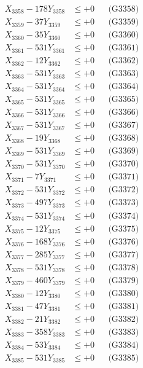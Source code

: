 \documentclass[a4paper,10pt]{article}
\begin{document}
{\begin{align}
X_{3358} - 178Y_{3358} &\leq +0 && \text{(G3358)} \\
X_{3359} - 37Y_{3359} &\leq +0 && \text{(G3359)} \\
X_{3360} - 35Y_{3360} &\leq +0 && \text{(G3360)} \\
\allowbreak
X_{3361} - 531Y_{3361} &\leq +0 && \text{(G3361)} \\
X_{3362} - 12Y_{3362} &\leq +0 && \text{(G3362)} \\
X_{3363} - 531Y_{3363} &\leq +0 && \text{(G3363)} \\
X_{3364} - 531Y_{3364} &\leq +0 && \text{(G3364)} \\
X_{3365} - 531Y_{3365} &\leq +0 && \text{(G3365)} \\
X_{3366} - 531Y_{3366} &\leq +0 && \text{(G3366)} \\
X_{3367} - 531Y_{3367} &\leq +0 && \text{(G3367)} \\
X_{3368} - 19Y_{3368} &\leq +0 && \text{(G3368)} \\
X_{3369} - 531Y_{3369} &\leq +0 && \text{(G3369)} \\
X_{3370} - 531Y_{3370} &\leq +0 && \text{(G3370)} \\
\allowbreak
X_{3371} - 7Y_{3371} &\leq +0 && \text{(G3371)} \\
X_{3372} - 531Y_{3372} &\leq +0 && \text{(G3372)} \\
X_{3373} - 497Y_{3373} &\leq +0 && \text{(G3373)} \\
X_{3374} - 531Y_{3374} &\leq +0 && \text{(G3374)} \\
X_{3375} - 12Y_{3375} &\leq +0 && \text{(G3375)} \\
X_{3376} - 168Y_{3376} &\leq +0 && \text{(G3376)} \\
X_{3377} - 285Y_{3377} &\leq +0 && \text{(G3377)} \\
X_{3378} - 531Y_{3378} &\leq +0 && \text{(G3378)} \\
X_{3379} - 460Y_{3379} &\leq +0 && \text{(G3379)} \\
X_{3380} - 12Y_{3380} &\leq +0 && \text{(G3380)} \\
\allowbreak
X_{3381} - 47Y_{3381} &\leq +0 && \text{(G3381)} \\
X_{3382} - 21Y_{3382} &\leq +0 && \text{(G3382)} \\
X_{3383} - 358Y_{3383} &\leq +0 && \text{(G3383)} \\
X_{3384} - 53Y_{3384} &\leq +0 && \text{(G3384)} \\
X_{3385} - 531Y_{3385} &\leq +0 && \text{(G3385)} \\

\end{align}}
\end{document}
